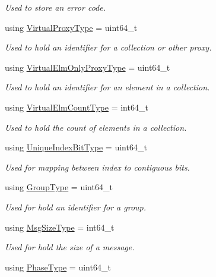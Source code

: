 \begin{DoxyCompactItemize}
\begin{DoxyCompactList}\small\item\em Used to store an error code. \end{DoxyCompactList}\item 
using \hyperlink{namespacevt_a1b417dd5d684f045bb58a0ede70045ac}{Virtual\+Proxy\+Type} = uint64\+\_\+t
\begin{DoxyCompactList}\small\item\em Used to hold an identifier for a collection or other proxy. \end{DoxyCompactList}\item 
using \hyperlink{namespacevt_aa68633cd16822ae31c1cf521f817a23e}{Virtual\+Elm\+Only\+Proxy\+Type} = uint64\+\_\+t
\begin{DoxyCompactList}\small\item\em Used to hold an identifier for an element in a collection. \end{DoxyCompactList}\item 
using \hyperlink{namespacevt_ac115668758184050beff7a9281a2c490}{Virtual\+Elm\+Count\+Type} = int64\+\_\+t
\begin{DoxyCompactList}\small\item\em Used to hold the count of elements in a collection. \end{DoxyCompactList}\item 
using \hyperlink{namespacevt_a913e1f07b5228dd8bb64040dc6dcea14}{Unique\+Index\+Bit\+Type} = uint64\+\_\+t
\begin{DoxyCompactList}\small\item\em Used for mapping between index to contiguous bits. \end{DoxyCompactList}\item 
using \hyperlink{namespacevt_a27b5e4411c9b6140c49100e050e2f743}{Group\+Type} = uint64\+\_\+t
\begin{DoxyCompactList}\small\item\em Used for hold an identifier for a group. \end{DoxyCompactList}\item 
using \hyperlink{namespacevt_a408e86a8c7c89309b52907dc5a513924}{Msg\+Size\+Type} = int64\+\_\+t
\begin{DoxyCompactList}\small\item\em Used for hold the size of a message. \end{DoxyCompactList}\item 
using \hyperlink{namespacevt_a46ce6733d5cdbd735d561b7b4029f6d7}{Phase\+Type} = uint64\+\_\+t

\end{DoxyCompactItemize}
